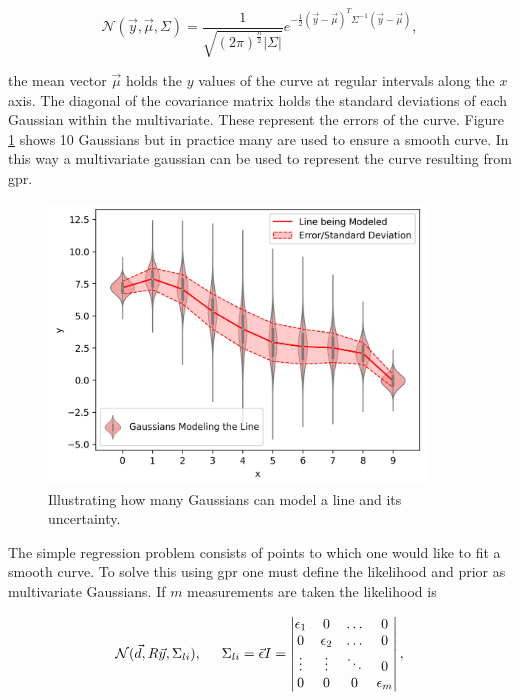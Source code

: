 \begin{equation}
  \mathcal{N}(\vec y, \vec{\mu}, \Sigma) = \frac{1}{\sqrt{(2\pi)^{\frac{n}{2}}|\Sigma|}} e^{{-\frac{1}{2}(\vec{y}-\vec{\mu})^T\Sigma^{-1}(\vec{y}-\vec{\mu})}},
  \label{eq:mvg}
  \end{equation}

the mean vector $\vec{\mu}$ holds the $y$ values of the curve at regular intervals along the $x$ axis. The diagonal of the covariance matrix holds the standard deviations of each Gaussian within the multivariate. These represent the errors of the curve. Figure \ref{fig:mvg} shows 10 Gaussians but in practice many are used to ensure a smooth curve. In this way a multivariate gaussian can be used to represent the curve resulting from \gls{gpr}.

\begin{figure}
  \centering
  \includegraphics[width=10cm]{images/mvg.png}
  \caption{Illustrating how many Gaussians can model a line and its uncertainty.}
  \label{fig:mvg}
\end{figure}

The simple regression problem consists of points to which one would like to fit a smooth curve. To solve this using \gls{gpr} one must define the likelihood and prior as multivariate Gaussians. If $m$ measurements are taken the likelihood is

\begin{equation}
  \mathcal{N}(\vec{d}, R\vec{y}, \Sigma_{li}),\hspace{0.5cm} \Sigma_{li} = \vec{\epsilon}I = 
    \begin{vmatrix}
        \epsilon_1 & 0 & \hdots & 0\\
        0 & \epsilon_2 & \hdots & 0\\
        \vdots & \vdots & \ddots & 0 \\
        0 & 0 & 0 &\epsilon_m
    \end{vmatrix},
  \label{eq:likelihood}
\end{equation}

